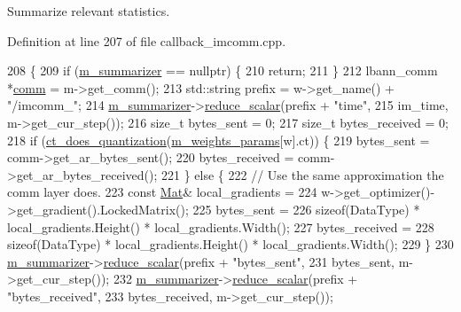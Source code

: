 Summarize relevant statistics. 

Definition at line 207 of file callback\+\_\+imcomm.\+cpp.


\begin{DoxyCode}
208                                                          \{
209   \textcolor{keywordflow}{if} (\hyperlink{classlbann_1_1lbann__callback_a277d46138184f85f161a8263b8322c76}{m\_summarizer} == \textcolor{keyword}{nullptr}) \{
210     \textcolor{keywordflow}{return};
211   \}
212   lbann\_comm *\hyperlink{file__io_8cpp_ab048c6f9fcbcfaa57ce68b00263dbebe}{comm} = m->get\_comm();
213   std::string prefix = w->get\_name() + \textcolor{stringliteral}{"/imcomm\_"};
214   \hyperlink{classlbann_1_1lbann__callback_a277d46138184f85f161a8263b8322c76}{m\_summarizer}->\hyperlink{classlbann_1_1lbann__summary_a3e0b9aae1f80403a195567fd25ea2525}{reduce\_scalar}(prefix + \textcolor{stringliteral}{"time"},
215                               im\_time, m->get\_cur\_step());
216   \textcolor{keywordtype}{size\_t} bytes\_sent = 0;
217   \textcolor{keywordtype}{size\_t} bytes\_received = 0;
218   \textcolor{keywordflow}{if} (\hyperlink{classlbann_1_1lbann__callback__imcomm_a8b29853e49c58cf737a741c503737705}{ct\_does\_quantization}(\hyperlink{classlbann_1_1lbann__callback__imcomm_a32a0319c91aff324cb3468de4f31dd50}{m\_weights\_params}[w].ct)) \{
219     bytes\_sent = comm->get\_ar\_bytes\_sent();
220     bytes\_received = comm->get\_ar\_bytes\_received();
221   \} \textcolor{keywordflow}{else} \{
222     \textcolor{comment}{// Use the same approximation the comm layer does.}
223     \textcolor{keyword}{const} \hyperlink{base_8hpp_a68f11fdc31b62516cb310831bbe54d73}{Mat}& local\_gradients =
224       w->get\_optimizer()->get\_gradient().LockedMatrix();
225     bytes\_sent =
226       \textcolor{keyword}{sizeof}(DataType) * local\_gradients.Height() * local\_gradients.Width();
227     bytes\_received =
228       \textcolor{keyword}{sizeof}(DataType) * local\_gradients.Height() * local\_gradients.Width();
229   \}
230   \hyperlink{classlbann_1_1lbann__callback_a277d46138184f85f161a8263b8322c76}{m\_summarizer}->\hyperlink{classlbann_1_1lbann__summary_a3e0b9aae1f80403a195567fd25ea2525}{reduce\_scalar}(prefix + \textcolor{stringliteral}{"bytes\_sent"},
231                               bytes\_sent, m->get\_cur\_step());
232   \hyperlink{classlbann_1_1lbann__callback_a277d46138184f85f161a8263b8322c76}{m\_summarizer}->\hyperlink{classlbann_1_1lbann__summary_a3e0b9aae1f80403a195567fd25ea2525}{reduce\_scalar}(prefix + \textcolor{stringliteral}{"bytes\_received"},
233                               bytes\_received, m->get\_cur\_step());

\end{DoxyCode}
